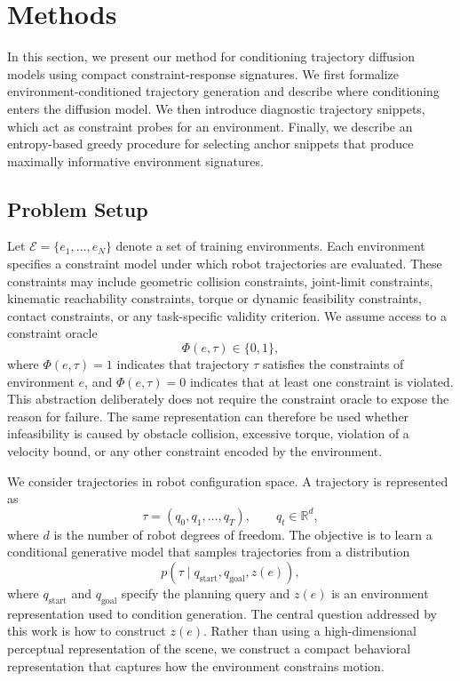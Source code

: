 
\section{Methods}\label{sec:methods}

In this section, we present our method for conditioning trajectory diffusion models using compact constraint-response signatures. We first formalize environment-conditioned trajectory generation and describe where conditioning enters the diffusion model. We then introduce diagnostic trajectory snippets, which act as constraint probes for an environment. Finally, we describe an entropy-based greedy procedure for selecting anchor snippets that produce maximally informative environment signatures.

\subsection{Problem Setup}

Let $\mathcal{E}=\{e_1,\ldots,e_N\}$ denote a set of training environments. Each environment specifies a constraint model under which robot trajectories are evaluated. These constraints may include geometric collision constraints, joint-limit constraints, kinematic reachability constraints, torque or dynamic feasibility constraints, contact constraints, or any task-specific validity criterion. We assume access to a constraint oracle
%
\begin{equation}
    \Phi(e,\tau) \in \{0,1\},
\end{equation}
%
where $\Phi(e,\tau)=1$ indicates that trajectory $\tau$ satisfies the constraints of environment $e$, and $\Phi(e,\tau)=0$ indicates that at least one constraint is violated. This abstraction deliberately does not require the constraint oracle to expose the reason for failure. The same representation can therefore be used whether infeasibility is caused by obstacle collision, excessive torque, violation of a velocity bound, or any other constraint encoded by the environment.

We consider trajectories in robot configuration space. A trajectory is represented as
%
\begin{equation}
    \tau = (q_0,q_1,\ldots,q_T), \qquad q_t\in\mathbb{R}^{d},
\end{equation}
%
where $d$ is the number of robot degrees of freedom. The objective is to learn a conditional generative model that samples trajectories from a distribution
%
\begin{equation}
    p(\tau \mid q_{\mathrm{start}}, q_{\mathrm{goal}}, z(e)),
\end{equation}
%
where $q_{\mathrm{start}}$ and $q_{\mathrm{goal}}$ specify the planning query and $z(e)$ is an environment representation used to condition generation. The central question addressed by this work is how to construct $z(e)$. Rather than using a high-dimensional perceptual representation of the scene, we construct a compact behavioral representation that captures how the environment constrains motion.

